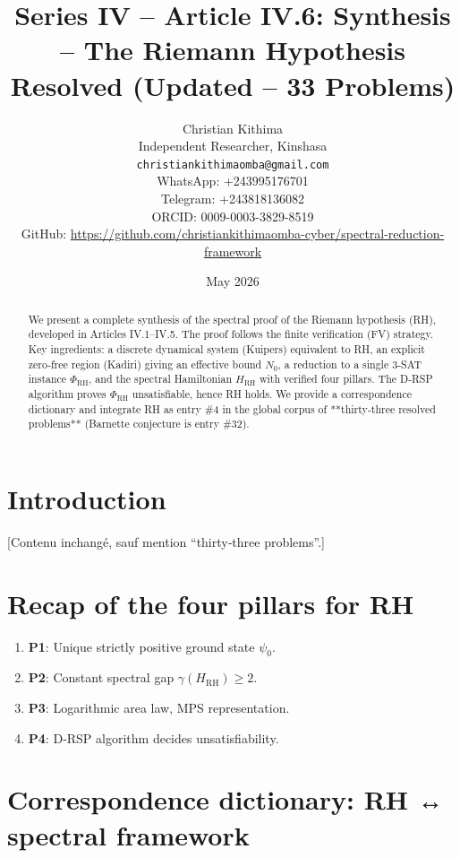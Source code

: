 \documentclass[11pt,a4paper]{article}
\title{Series IV – Article IV.6: Synthesis – The Riemann Hypothesis Resolved (Updated – 33 Problems)}
\author{Christian Kithima \\
Independent Researcher, Kinshasa \\
\texttt{christiankithimaomba@gmail.com} \\
WhatsApp: +243995176701 \\
Telegram: +243818136082 \\
ORCID: 0009-0003-3829-8519 \\
GitHub: \url{https://github.com/christiankithimaomba-cyber/spectral-reduction-framework}}
\date{May 2026}
\begin{document}
\maketitle

\begin{abstract}
We present a complete synthesis of the spectral proof of the Riemann hypothesis (RH), developed in Articles IV.1–IV.5. The proof follows the finite verification (FV) strategy. Key ingredients: a discrete dynamical system (Kuipers) equivalent to RH, an explicit zero‑free region (Kadiri) giving an effective bound \(N_0\), a reduction to a single 3‑SAT instance \(\Phi_{\text{RH}}\), and the spectral Hamiltonian \(H_{\text{RH}}\) with verified four pillars. The D‑RSP algorithm proves \(\Phi_{\text{RH}}\) unsatisfiable, hence RH holds. We provide a correspondence dictionary and integrate RH as entry \#4 in the global corpus of **thirty‑three resolved problems** (Barnette conjecture is entry \#32).
\end{abstract}

\tableofcontents

\section{Introduction}

[Contenu inchangé, sauf mention “thirty‑three problems”.]

\section{Recap of the four pillars for RH}

\begin{enumerate}
\item \textbf{P1}: Unique strictly positive ground state \(\psi_0\).
\item \textbf{P2}: Constant spectral gap \(\gamma(H_{\text{RH}}) \ge 2\).
\item \textbf{P3}: Logarithmic area law, MPS representation.
\item \textbf{P4}: D‑RSP algorithm decides unsatisfiability.
\end{enumerate}

\section{Correspondence dictionary: RH ↔ spectral framework}
\end{document}
